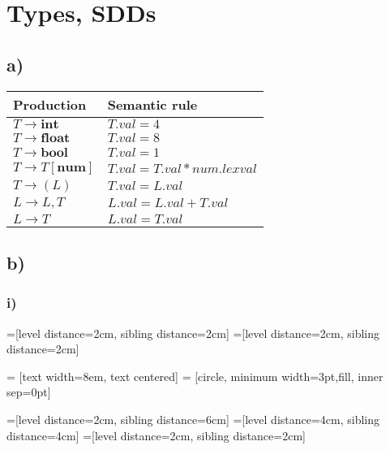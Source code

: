 \section{Types, SDDs}
\subsection*{a)}
\begin{tabular}{l | l}

Production 			& Semantic rule			\\
\hline
$T \rightarrow \textbf{int}$ 	& $T.val = 4$ 			\\ 
$T \rightarrow \textbf{float}$	& $T.val = 8$			\\
$T \rightarrow \textbf{bool}$	& $T.val = 1$			\\
$T \rightarrow T[\textbf{num}]$	& $T.val = T.val * num.lexval$ 	\\
$T \rightarrow (L)$		& $T.val = L.val$ 		\\
$L \rightarrow L,T$		& $L.val = L.val + T.val$	\\
$L \rightarrow T$		& $L.val = T.val$		\\
\end{tabular}

\subsection*{b)}
\subsubsection*{i)}
=[level distance=2cm, sibling distance=2cm]
=[level distance=2cm, sibling distance=2cm]

 = [text width=8em, text centered]
 = [circle, minimum width=3pt,fill, inner sep=0pt]

=[level distance=2cm, sibling distance=6cm]
=[level distance=4cm, sibling distance=4cm]
=[level distance=2cm, sibling distance=2cm]

